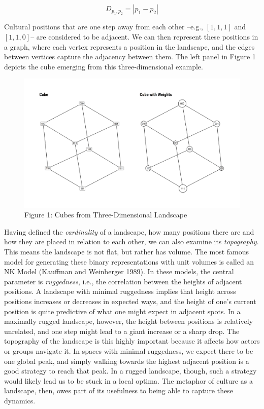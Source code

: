\documentclass[
  11pt,
]{article}
\begin{document}
\[
D_{p_1, p_2} = | p_1 - p_2 |
\]

Cultural positions that are one step away from each other --e.g.,
\([1, 1, 1]\) and \([1, 1, 0]\)-- are considered to be adjacent. We can
then represent these positions in a graph, where each vertex represents
a position in the landscape, and the edges between vertices capture the
adjacency between them. The left panel in Figure 1 depicts the cube
emerging from this three-dimensional example.

\begin{figure}[htp]
\begin{center}
\caption*{Figure 1: Cubes from Three-Dimensional Landscape}

\begin{center}\includegraphics[width=1\linewidth]{../figures/figure_1} \end{center}

\end{center}
\end{figure}

Having defined the \emph{cardinality} of a landscape, how many positions
there are and how they are placed in relation to each other, we can also
examine its \emph{topography}. This means the landscape is not flat, but
rather has volume. The most famous model for generating these binary
representations with unit volumes is called an NK Model (Kauffman and
Weinberger 1989). In these models, the central parameter is
\emph{ruggedness}, i.e., the correlation between the heights of adjacent
positions. A landscape with minimal ruggedness implies that height
across positions increases or decreases in expected ways, and the height
of one's current position is quite predictive of what one might expect
in adjacent spots. In a maximally rugged landscape, however, the height
between positions is relatively unrelated, and one step might lead to a
giant increase or a sharp drop. The topography of the landscape is this
highly important because it affects how actors or groups navigate it. In
spaces with minimal ruggedness, we expect there to be one global peak,
and simply walking towards the highest adjacent position is a good
strategy to reach that peak. In a rugged landscape, though, such a
strategy would likely lead us to be stuck in a local optima. The
metaphor of culture as a landscape, then, owes part of its usefulness to
being able to capture these dynamics.
\end{document}

